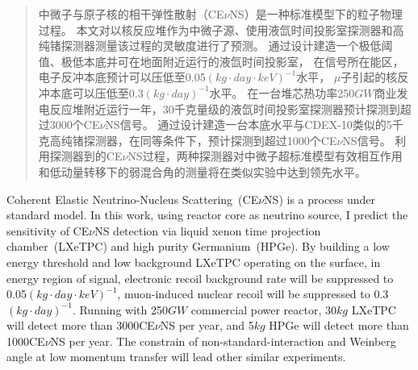 

\begin{abstract}
  中微子与原子核的相干弹性散射（CE$\nu$NS）是一种标准模型下的粒子物理过程。
  本文对以核反应堆作为中微子源、使用液氙时间投影室探测器和高纯锗探测器测量该过程的灵敏度进行了预测。
  通过设计建造一个极低阈值、极低本底并可在地面附近运行的液氙时间投影室，
  在信号所在能区，电子反冲本底预计可以压低至0.05$\left(\si{kg}\cdot\si{day}\cdot\si{keV}\right)^{-1}$水平，
  $\mu$子引起的核反冲本底可以压低至0.3$\left(\si{kg}\cdot\si{day}\right)^{-1}$水平。
  在一台堆芯热功率250$\si{GW}$商业发电反应堆附近运行一年，30千克量级的液氙时间投影室探测器预计探测到超过3000个CE$\nu$NS信号。
  通过设计建造一台本底水平与CDEX-10类似的5千克高纯锗探测器，在同等条件下，预计探测到超过1000个CE$\nu$NS信号。
  利用探测器到的CE$\nu$NS过程，两种探测器对中微子超标准模型有效相互作用和低动量转移下的弱混合角的测量将在类似实验中达到领先水平。

\end{abstract}

\begin{abstract*}
  Coherent Elastic Neutrino-Nucleus Scattering~(CE$\nu$NS) is a process under standard model.
  In this work, using reactor core as neutrino source, 
  I predict the sensitivity of CE$\nu$NS detection via liquid xenon time projection chamber~(LXeTPC) and high purity Germanium~(HPGe).
  By building a low energy threshold and low background LXeTPC operating on the surface,
  in energy region of signal, electronic recoil background rate will be suppressed to 0.05$\left(\si{kg}\cdot\si{day}\cdot\si{keV}\right)^{-1}$,
  muon-induced nuclear recoil will be suppressed to 0.3$\left(\si{kg}\cdot\si{day}\right)^{-1}$. 
  Running with 250$\si{GW}$ commercial power reactor, 30$\si{kg}$ LXeTPC will detect more than 3000CE$\nu$NS per year, 
  and 5$\si{kg}$ HPGe will detect more than 1000CE$\nu$NS per year. 
  The constrain of non-standard-interaction and Weinberg angle at low momentum transfer will lead other similar experiments.

\end{abstract*}
